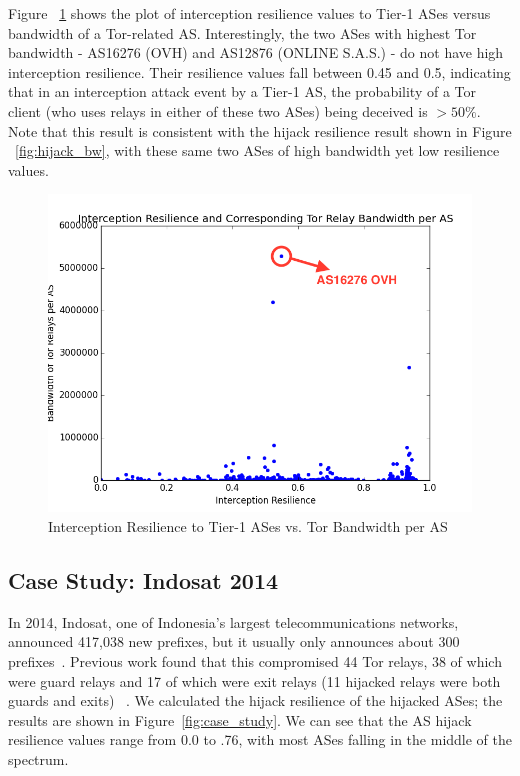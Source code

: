 Figure ~\ref{fig:interception_bw} shows the plot of interception resilience values to Tier-1 ASes versus bandwidth of a Tor-related AS. Interestingly, the two ASes with highest Tor bandwidth - AS16276 (OVH) and AS12876 (ONLINE S.A.S.) - do not have high interception resilience. Their resilience values fall between 0.45 and 0.5, indicating that in an interception attack event by a Tier-1 AS, the probability of a Tor client (who uses relays in either of these two ASes) being deceived is $> 50\%$. Note that this result is consistent with the hijack resilience result shown in Figure ~\ref{fig:hijack_bw}, with these same two ASes of high bandwidth yet low resilience values. 

\begin{figure}[ht!]
\centering
\includegraphics[width=.4\textwidth]{interception_bandwidth}
\caption{Interception Resilience to Tier-1 ASes vs. Tor Bandwidth per AS}
\label{fig:interception_bw}
\end{figure}

\subsection{Case Study: Indosat 2014}
In 2014, Indosat, one of Indonesia's largest telecommunications networks, announced 417,038 new prefixes, but it usually only announces about 300 prefixes~\cite{indosat2014}.  Previous work found that this compromised 44 Tor relays, 38 of which were guard relays and 17 of which were exit relays (11 hijacked relays were both guards and exits) ~\cite{sun2015raptor}.  We calculated the hijack resilience of the hijacked ASes; the results are shown in Figure~\ref{fig:case_study}.  We can see that the AS hijack resilience values range from 0.0 to .76, with most ASes falling in the middle of the spectrum. 


